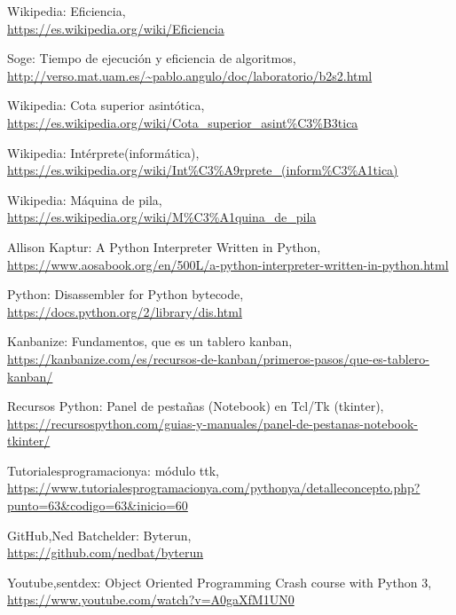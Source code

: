 \documentclass[a4paper,12pt,twoside]{memoir}
\begin{document}
\begin{thebibliography}{8}

Wikipedia: Eficiencia,
\\\url{https://es.wikipedia.org/wiki/Eficiencia}

Soge: Tiempo de ejecución y eficiencia de algoritmos,
\\\url{http://verso.mat.uam.es/~pablo.angulo/doc/laboratorio/b2s2.html}

Wikipedia: Cota superior asintótica,
\\\url{https://es.wikipedia.org/wiki/Cota_superior_asint%C3%B3tica}

Wikipedia: Intérprete(informática),
\\\url{https://es.wikipedia.org/wiki/Int%C3%A9rprete_(inform%C3%A1tica)}

Wikipedia: Máquina de pila,
\\\url{https://es.wikipedia.org/wiki/M%C3%A1quina_de_pila}

Allison Kaptur: A Python Interpreter Written in Python,
\\\url{https://www.aosabook.org/en/500L/a-python-interpreter-written-in-python.html}

Python: Disassembler for Python bytecode,
\\\url{https://docs.python.org/2/library/dis.html}

Kanbanize: Fundamentos, que es un tablero kanban,
\\\url{https://kanbanize.com/es/recursos-de-kanban/primeros-pasos/que-es-tablero-kanban/}

Recursos Python: Panel de pestañas (Notebook) en Tcl/Tk (tkinter),
\\\url{https://recursospython.com/guias-y-manuales/panel-de-pestanas-notebook-tkinter/}

Tutorialesprogramacionya: módulo ttk,
\\\url{https://www.tutorialesprogramacionya.com/pythonya/detalleconcepto.php?punto=63&codigo=63&inicio=60}

GitHub,Ned Batchelder: Byterun,
\\\url{https://github.com/nedbat/byterun}

Youtube,sentdex: Object Oriented Programming Crash course with Python 3,
\\\url{https://www.youtube.com/watch?v=A0gaXfM1UN0}


\end{thebibliography}
\end{document}
